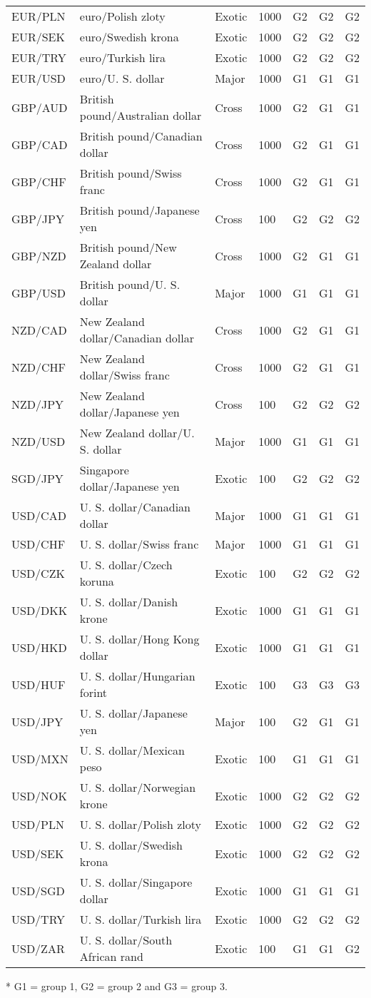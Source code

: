 \begin{table*}
\begin{center}
\begin{centering}
\begin{threeparttable}
\begin{tabular}{lllllll}
    EUR/PLN & euro/Polish zloty & Exotic & 1000 & G2 & G2 & G2\tabularnewline
    EUR/SEK & euro/Swedish krona & Exotic & 1000 & G2 & G2 & G2\tabularnewline
    EUR/TRY & euro/Turkish lira & Exotic & 1000 & G2 & G2 & G2\tabularnewline
    EUR/USD & euro/U. S. dollar & Major & 1000 & G1 & G1 & G1\tabularnewline
    GBP/AUD & British pound/Australian dollar & Cross & 1000 & G2 & G1 & G1\tabularnewline
    GBP/CAD & British pound/Canadian dollar & Cross & 1000 & G2 & G1 & G1\tabularnewline
    GBP/CHF & British pound/Swiss franc & Cross & 1000 & G2 & G1 & G1\tabularnewline
    GBP/JPY & British pound/Japanese yen & Cross & 100 & G2 & G2 & G2\tabularnewline
    GBP/NZD & British pound/New Zealand dollar & Cross & 1000 & G2 & G1 & G1\tabularnewline
    GBP/USD & British pound/U. S. dollar & Major & 1000 & G1 & G1 & G1\tabularnewline
    NZD/CAD & New Zealand dollar/Canadian dollar & Cross & 1000 & G2 & G1 & G1\tabularnewline
    NZD/CHF & New Zealand dollar/Swiss franc & Cross & 1000 & G2 & G1 & G1\tabularnewline
    NZD/JPY & New Zealand dollar/Japanese yen & Cross & 100 & G2 & G2 & G2\tabularnewline
    NZD/USD & New Zealand dollar/U. S. dollar & Major & 1000 & G1 & G1 & G1\tabularnewline
    SGD/JPY & Singapore dollar/Japanese yen & Exotic & 100 & G2 & G2 & G2\tabularnewline
    USD/CAD & U. S. dollar/Canadian dollar & Major & 1000 & G1 & G1 & G1\tabularnewline
    USD/CHF & U. S. dollar/Swiss franc & Major & 1000 & G1 & G1 & G1\tabularnewline
    USD/CZK & U. S. dollar/Czech koruna & Exotic & 100 & G2 & G2 & G2\tabularnewline
    USD/DKK & U. S. dollar/Danish krone & Exotic & 1000 & G1 & G1 & G1\tabularnewline
    USD/HKD & U. S. dollar/Hong Kong dollar & Exotic & 1000 & G1 & G1 & G1\tabularnewline
    USD/HUF & U. S. dollar/Hungarian forint & Exotic & 100 & G3 & G3 & G3\tabularnewline
    USD/JPY & U. S. dollar/Japanese yen & Major & 100 & G2 & G1 & G1\tabularnewline
    USD/MXN & U. S. dollar/Mexican peso & Exotic & 100 & G1 & G1 & G1\tabularnewline
    USD/NOK & U. S. dollar/Norwegian krone & Exotic & 1000 & G2 & G2 & G2\tabularnewline
    USD/PLN & U. S. dollar/Polish zloty & Exotic & 1000 & G2 & G2 & G2\tabularnewline
    USD/SEK & U. S. dollar/Swedish krona & Exotic & 1000 & G2 & G2 & G2\tabularnewline
    USD/SGD & U. S. dollar/Singapore dollar & Exotic & 1000 & G1 & G1 & G1\tabularnewline
    USD/TRY & U. S. dollar/Turkish lira & Exotic & 1000 & G2 & G2 & G2\tabularnewline
    USD/ZAR & U. S. dollar/South African rand & Exotic & 100 & G1 & G1 & G2\tabularnewline
    \end{tabular}

    \begin{tablenotes}
    \item[*] G1 = group 1, G2 = group 2 and G3 = group 3.
    \end{tablenotes}
    \end{threeparttable}
\end{centering}
\end{center}
\end{table*}

